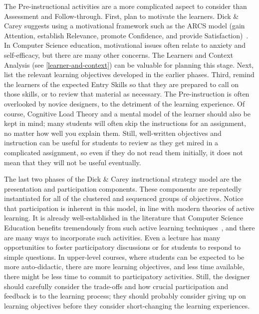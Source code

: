 The Pre-instructional activities are a more complicated aspect to consider than Assessment and Follow-through.
First, plan to motivate the learners.
Dick \& Carey suggests using a motivational framework such as the ARCS model (gain Attention, establish Relevance, promote Confidence, and provide Satisfaction)~\citep{keller1987development}.
In Computer Science education, motivational issues often relate to anxiety and self-efficacy, but there are many other concerns.
The Learners and Context Analysis (see \ref{learner-and-context}) can be valuable for planning this stage.
Next, list the relevant learning objectives developed in the earlier phases.
Third, remind the learners of the expected Entry Skills so that they are prepared to call on those skills, or to review that material as necessary.
The Pre-instruction is often overlooked by novice designers, to the detriment of the learning experience.
Of course, Cognitive Load Theory and a mental model of the learner should also be kept in mind; many students will often skip the instructions for an assignment, no matter how well you explain them.
Still, well-written objectives and instruction can be useful for students to review as they get mired in a complicated assignment, so even if they do not read them initially, it does not mean that they will not be useful eventually.

The last two phases of the Dick \& Carey instructional strategy model are the presentation and participation components.
These components are repeatedly instantiated for all of the clustered and sequenced groups of objectives.
Notice that participation is inherent in this model, in line with modern theories of active learning.
It is already well-established in the literature that Computer Science Education benefits tremendously from such active learning techniques~\citep{mcconnell1996active}, and there are many ways to incorporate such activities.
Even a lecture has many opportunities to foster participatory discussions or for students to respond to simple questions.
In upper-level courses, where students can be expected to be more auto-didactic, there are more learning objectives, and less time available, there might be less time to commit to participatory activities.
Still, the designer should carefully consider the trade-offs and how crucial participation and feedback is to the learning process; they should probably consider giving up on learning objectives before they consider short-changing the learning experiences.

